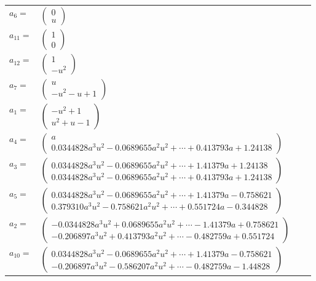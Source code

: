 \documentclass[1p]{elsarticle_modified}
\theoremstyle{definition}
\begin{document}
\begin{tabular}{m{7pt} m{180pt} m{7pt} m{180pt} }
\flushright $a_{6}=$&$\begin{pmatrix}0\\u\end{pmatrix}$ \\
\flushright $a_{11}=$&$\begin{pmatrix}1\\0\end{pmatrix}$ \\
\flushright $a_{12}=$&$\begin{pmatrix}1\\- u^2\end{pmatrix}$ \\
\flushright $a_{7}=$&$\begin{pmatrix}u\\- u^2- u+1\end{pmatrix}$ \\
\flushright $a_{1}=$&$\begin{pmatrix}- u^2+1\\u^2+u-1\end{pmatrix}$ \\
\flushright $a_{4}=$&$\begin{pmatrix}a\\0.0344828 a^{3} u^{2}-0.0689655 a^{2} u^{2}+\cdots+0.413793 a+1.24138\end{pmatrix}$ \\
\flushright $a_{3}=$&$\begin{pmatrix}0.0344828 a^{3} u^{2}-0.0689655 a^{2} u^{2}+\cdots+1.41379 a+1.24138\\0.0344828 a^{3} u^{2}-0.0689655 a^{2} u^{2}+\cdots+0.413793 a+1.24138\end{pmatrix}$ \\
\flushright $a_{5}=$&$\begin{pmatrix}0.0344828 a^{3} u^{2}-0.0689655 a^{2} u^{2}+\cdots+1.41379 a-0.758621\\0.379310 a^{3} u^{2}-0.758621 a^{2} u^{2}+\cdots+0.551724 a-0.344828\end{pmatrix}$ \\
\flushright $a_{2}=$&$\begin{pmatrix}-0.0344828 a^{3} u^{2}+0.0689655 a^{2} u^{2}+\cdots-1.41379 a+0.758621\\-0.206897 a^{3} u^{2}+0.413793 a^{2} u^{2}+\cdots-0.482759 a+0.551724\end{pmatrix}$ \\
\flushright $a_{10}=$&$\begin{pmatrix}0.0344828 a^{3} u^{2}-0.0689655 a^{2} u^{2}+\cdots+1.41379 a-0.758621\\-0.206897 a^{3} u^{2}-0.586207 a^{2} u^{2}+\cdots-0.482759 a-1.44828\end{pmatrix}$ \\

\end{tabular}
\end{document}
